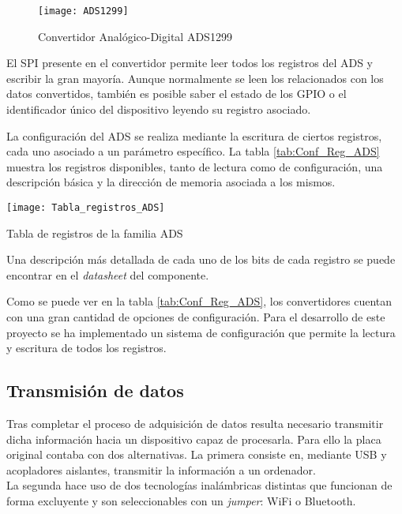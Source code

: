 \begin{figure} [h]
    \centering
    \texttt{[image: ADS1299]}
    \caption{Convertidor Analógico-Digital ADS1299}
    \label{fig:ADS1299}
\end{figure}

El \acrshort{SPI} presente en el convertidor permite leer todos los registros del ADS y escribir la gran mayoría. Aunque normalmente se leen los relacionados con los datos convertidos, también es posible saber el estado de los \acrshort{GPIO} o el identificador único del dispositivo leyendo su registro asociado.

La configuración del ADS se realiza mediante la escritura de ciertos registros, cada uno asociado a un parámetro específico. La tabla \ref{tab:Conf_Reg_ADS} muestra los registros disponibles, tanto de lectura como de configuración, una descripción básica y la dirección de memoria asociada a los mismos.

\begin{table} [h]
    \centering
    \texttt{[image: Tabla\_registros\_ADS]}
    \caption{Tabla de registros de la familia ADS}
    \label{tab:Conf_Reg_ADS}
\end{table}

Una descripción más detallada de cada uno de los bits de cada registro se puede encontrar en el \textit{datasheet} del componente\cite{Datasheet_ADS}.

Como se puede ver en la tabla \ref{tab:Conf_Reg_ADS}, los convertidores cuentan con una gran cantidad de opciones de configuración. Para el desarrollo de este proyecto se ha implementado un sistema de configuración que permite la lectura y escritura de todos los registros.

\subsection{Transmisión de datos\label{sec:Transmisión_N}}

Tras completar el proceso de adquisición de datos resulta necesario transmitir dicha información hacia un dispositivo capaz de procesarla. Para ello la placa original contaba con dos alternativas. La primera consiste en, mediante \acrshort{USB} y acopladores aislantes, transmitir la información a un ordenador. 
\\La segunda hace uso de dos tecnologías inalámbricas distintas que funcionan de forma excluyente y son seleccionables con un \textit{jumper}: WiFi o Bluetooth.


